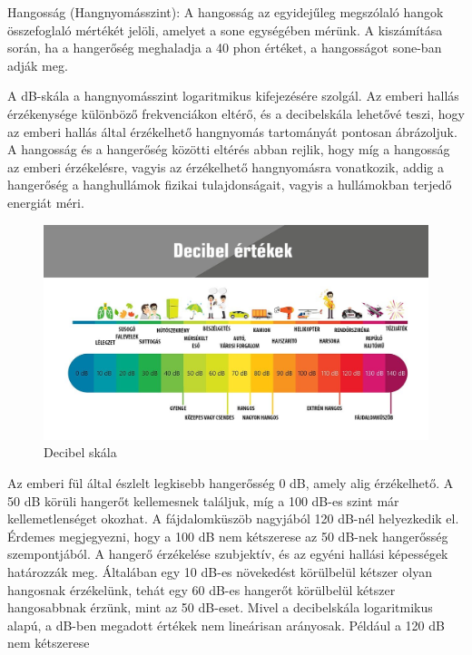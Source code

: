 Hangosság (Hangnyomásszint):
A hangosság az egyidejűleg megszólaló hangok összefoglaló mértékét jelöli, amelyet a sone egységében mérünk. 
A kiszámítása során, ha a hangerőség meghaladja a 40 phon értéket, a hangosságot sone-ban adják meg.

A dB-skála a hangnyomásszint logaritmikus kifejezésére szolgál. Az emberi hallás érzékenysége különböző 
frekvenciákon eltérő, és a decibelskála lehetővé teszi, hogy az emberi hallás által 
érzékelhető hangnyomás tartományát pontosan ábrázoljuk.
A hangosság és a hangerőség közötti eltérés abban rejlik, hogy míg a hangosság az emberi érzékelésre, 
vagyis az érzékelhető hangnyomásra vonatkozik, addig a hangerőség a hanghullámok 
fizikai tulajdonságait, vagyis a hullámokban terjedő energiát méri.
\begin{figure}[H]
	\centering
	\includegraphics[width=\linewidth, keepaspectratio]{figures/db_scale.jpg}
    \caption{Decibel skála~\cite{DECIBELSCALE}}\label{fig:db_scale}
\end{figure}
Az emberi fül által észlelt legkisebb hangerősség 0 dB, amely alig érzékelhető. 
A 50 dB körüli hangerőt kellemesnek találjuk, míg a 100 dB-es szint már kellemetlenséget 
okozhat. A fájdalomküszöb nagyjából 120 dB-nél helyezkedik el. Érdemes megjegyezni, hogy 
a 100 dB nem kétszerese az 50 dB-nek hangerősség szempontjából. A hangerő érzékelése 
szubjektív, és az egyéni hallási képességek határozzák meg. Általában egy 10 dB-es 
növekedést körülbelül kétszer olyan hangosnak érzékelünk, tehát egy 60 dB-es hangerőt 
körülbelül kétszer hangosabbnak érzünk, mint az 50 dB-eset. Mivel a decibelskála logaritmikus 
alapú, a dB-ben megadott értékek nem lineárisan arányosak. Például a 120 dB nem kétszerese 
